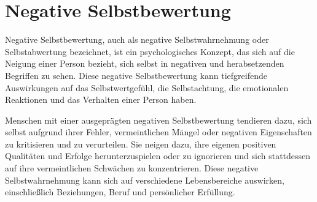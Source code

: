 \section{Negative Selbstbewertung}

Negative Selbstbewertung, auch als negative Selbstwahrnehmung oder Selbstabwertung bezeichnet, ist ein psychologisches Konzept, das sich auf die Neigung einer Person bezieht, sich selbst in negativen und herabsetzenden Begriffen zu sehen. Diese negative Selbstbewertung kann tiefgreifende Auswirkungen auf das Selbstwertgefühl, die Selbstachtung, die emotionalen Reaktionen und das Verhalten einer Person haben.

Menschen mit einer ausgeprägten negativen Selbstbewertung tendieren dazu, sich selbst aufgrund ihrer Fehler, vermeintlichen Mängel oder negativen Eigenschaften zu kritisieren und zu verurteilen. Sie neigen dazu, ihre eigenen positiven Qualitäten und Erfolge herunterzuspielen oder zu ignorieren und sich stattdessen auf ihre vermeintlichen Schwächen zu konzentrieren. Diese negative Selbstwahrnehmung kann sich auf verschiedene Lebensbereiche auswirken, einschließlich Beziehungen, Beruf und persönlicher Erfüllung.


